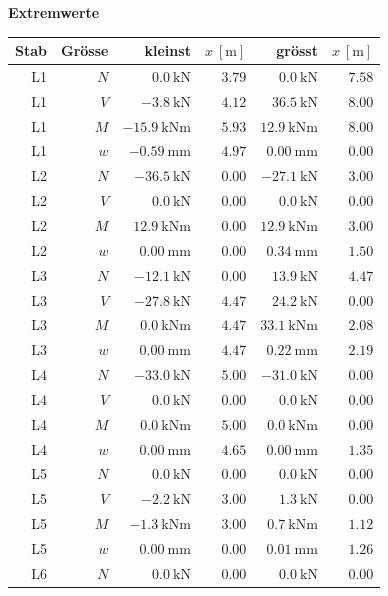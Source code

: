 \documentclass[11pt,a4paper]{article}
\begin{document}
\noindent\textbf{Extremwerte}
\begin{longtable}{rrrrrr}
\hline
Stab & Grösse & kleinst & $x\ [\mathrm{m}]$ & grösst & $x\ [\mathrm{m}]$ \\
\hline
\endhead
L1 & $N$ & $0.0\ \mathrm{kN}$ & $3.79$ & $0.0\ \mathrm{kN}$ & $7.58$ \\
L1 & $V$ & $-3.8\ \mathrm{kN}$ & $4.12$ & $36.5\ \mathrm{kN}$ & $8.00$ \\
L1 & $M$ & $-15.9\ \mathrm{kNm}$ & $5.93$ & $12.9\ \mathrm{kNm}$ & $8.00$ \\
L1 & $w$ & $-0.59\ \mathrm{mm}$ & $4.97$ & $0.00\ \mathrm{mm}$ & $0.00$ \\
L2 & $N$ & $-36.5\ \mathrm{kN}$ & $0.00$ & $-27.1\ \mathrm{kN}$ & $3.00$ \\
L2 & $V$ & $0.0\ \mathrm{kN}$ & $0.00$ & $0.0\ \mathrm{kN}$ & $0.00$ \\
L2 & $M$ & $12.9\ \mathrm{kNm}$ & $0.00$ & $12.9\ \mathrm{kNm}$ & $3.00$ \\
L2 & $w$ & $0.00\ \mathrm{mm}$ & $0.00$ & $0.34\ \mathrm{mm}$ & $1.50$ \\
L3 & $N$ & $-12.1\ \mathrm{kN}$ & $0.00$ & $13.9\ \mathrm{kN}$ & $4.47$ \\
L3 & $V$ & $-27.8\ \mathrm{kN}$ & $4.47$ & $24.2\ \mathrm{kN}$ & $0.00$ \\
L3 & $M$ & $0.0\ \mathrm{kNm}$ & $4.47$ & $33.1\ \mathrm{kNm}$ & $2.08$ \\
L3 & $w$ & $0.00\ \mathrm{mm}$ & $4.47$ & $0.22\ \mathrm{mm}$ & $2.19$ \\
L4 & $N$ & $-33.0\ \mathrm{kN}$ & $5.00$ & $-31.0\ \mathrm{kN}$ & $0.00$ \\
L4 & $V$ & $0.0\ \mathrm{kN}$ & $0.00$ & $0.0\ \mathrm{kN}$ & $0.00$ \\
L4 & $M$ & $0.0\ \mathrm{kNm}$ & $5.00$ & $0.0\ \mathrm{kNm}$ & $0.00$ \\
L4 & $w$ & $0.00\ \mathrm{mm}$ & $4.65$ & $0.00\ \mathrm{mm}$ & $1.35$ \\
L5 & $N$ & $0.0\ \mathrm{kN}$ & $0.00$ & $0.0\ \mathrm{kN}$ & $0.00$ \\
L5 & $V$ & $-2.2\ \mathrm{kN}$ & $3.00$ & $1.3\ \mathrm{kN}$ & $0.00$ \\
L5 & $M$ & $-1.3\ \mathrm{kNm}$ & $3.00$ & $0.7\ \mathrm{kNm}$ & $1.12$ \\
L5 & $w$ & $0.00\ \mathrm{mm}$ & $0.00$ & $0.01\ \mathrm{mm}$ & $1.26$ \\
L6 & $N$ & $0.0\ \mathrm{kN}$ & $0.00$ & $0.0\ \mathrm{kN}$ & $0.00$ \\

\end{longtable}
\end{document}
